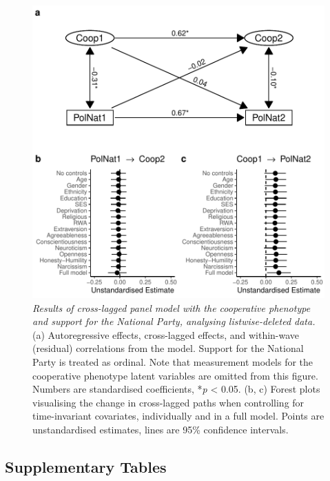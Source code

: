 \documentclass[
  man,floatsintext]{apa6}
\begin{document}
\begin{figure}
\centering
\includegraphics{manuscript_files/figure-latex/clpmPlotBPolNat-1.pdf}
\caption{\label{fig:clpmPlotBPolNat}\emph{Results of cross-lagged panel model with the
cooperative phenotype and support for the National Party, analysing
listwise-deleted data.} (a) Autoregressive effects, cross-lagged effects, and
within-wave (residual) correlations from the model. Support for the National
Party is treated as ordinal. Note that measurement models for the cooperative
phenotype latent variables are omitted from this figure. Numbers are
standardised coefficients, *\emph{p} \textless{} 0.05. (b, c) Forest plots visualising the
change in cross-lagged paths when controlling for time-invariant covariates,
individually and in a full model. Points are unstandardised estimates, lines are
95\% confidence intervals.}
\end{figure}

\newpage

\hypertarget{supplementary-tables}{%
\subsection{Supplementary Tables}\label{supplementary-tables}}
\end{document}
